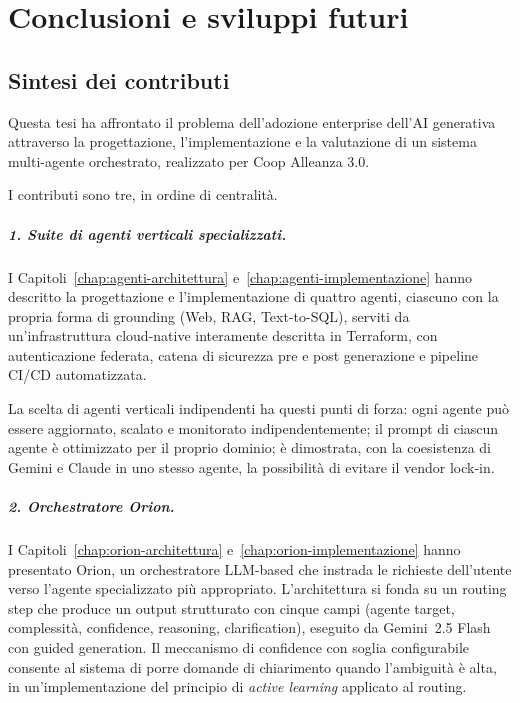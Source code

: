 
\chapter{Conclusioni e sviluppi futuri}
\label{chap:conclusioni}

\section{Sintesi dei contributi}
\label{sec:concl-sintesi}

Questa tesi ha affrontato il problema dell'adozione enterprise dell'AI generativa attraverso la progettazione, 
l'implementazione e la valutazione di un sistema multi-agente orchestrato, 
realizzato per Coop Alleanza 3.0. 

I contributi sono tre, in ordine di centralità.

\paragraph{1. Suite di agenti verticali specializzati.} I Capitoli~\ref{chap:agenti-architettura} e~\ref{chap:agenti-implementazione} hanno descritto la progettazione e l'implementazione di quattro agenti,
ciascuno con la propria forma di grounding (Web, RAG, Text-to-SQL), serviti da un'infrastruttura cloud-native interamente descritta in Terraform, 
con autenticazione federata, catena di sicurezza pre e post generazione e pipeline CI/CD automatizzata.

La scelta di agenti verticali indipendenti ha questi punti di forza: ogni agente può essere aggiornato, scalato e monitorato indipendentemente; 
il prompt di ciascun agente è ottimizzato per il proprio dominio; è dimostrata, con la coesistenza di Gemini e Claude in uno stesso agente,
la possibilità di evitare il vendor lock-in.

\paragraph{2. Orchestratore Orion.} I Capitoli~\ref{chap:orion-architettura} e~\ref{chap:orion-implementazione} hanno presentato Orion, 
un orchestratore LLM-based che instrada le richieste dell'utente verso l'agente specializzato più appropriato. 
L'architettura si fonda su un routing step che produce un output strutturato con cinque campi (agente target, complessità, confidence, reasoning, clarification), 
eseguito da Gemini~2.5 Flash con guided generation. Il meccanismo di confidence con soglia configurabile consente al sistema di porre domande di chiarimento quando l'ambiguità è alta, 
in un'implementazione del principio di \emph{active learning} applicato al routing.

